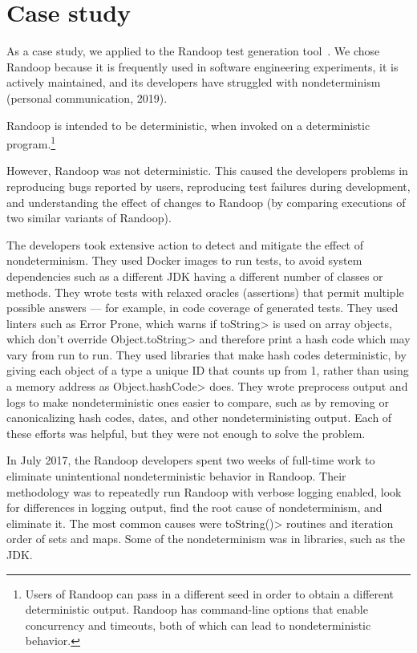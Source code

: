 \section{Case study}\label{sec:randoop-case-study}

As a case study, we applied \theDeterminismChecker to the Randoop test
generation tool~\ifanonymous{}\else\cite{PachecoLEB2007}\fi.
We chose Randoop because 
it is frequently used in software engineering experiments,
it is actively maintained,
and its developers have struggled with nondeterminism (personal
communication, 2019).

Randoop is intended to be deterministic, when invoked on a deterministic
program.\footnote{Users of Randoop can pass in a different seed in order to
  obtain a different deterministic output.  Randoop has command-line
  options that enable concurrency and timeouts, both of which can lead to
  nondeterministic behavior.}

However, Randoop was not deterministic.  This caused the developers
problems in 
reproducing bugs reported by users, 
reproducing test failures during development, and
understanding the effect of changes to Randoop (by comparing executions of two
similar variants of Randoop).

The developers took extensive action to detect and mitigate the effect of nondeterminism.
They used Docker images to run tests, to avoid system dependencies such as
a different JDK having a different number of classes or methods.
They wrote tests with relaxed oracles (assertions) that permit multiple
possible answers --- for example, in code coverage of generated tests.
They used linters such as Error Prone, which warns if \<toString> is used on
array objects, which don't override \<Object.toString> and therefore print a
hash code which may vary from run to run.
They used libraries that make hash codes deterministic, by giving each
object of a type a unique ID that counts up from 1, rather than using a
memory address as \<Object.hashCode> does.
They wrote preprocess output and logs to make nondeterministic ones easier
to compare, such as by removing or canonicalizing hash codes, dates, and
other nondeterministing output.
Each of these efforts was helpful, but they were not enough to solve the problem.

In July 2017, the Randoop developers spent two weeks of full-time work to
eliminate unintentional nondeterministic behavior in Randoop.
Their methodology was to repeatedly
 run Randoop with verbose logging enabled,
 look for differences in logging output,
 find the root cause of nondeterminism,
 and eliminate it.
The most common causes were \<toString()> routines and iteration order of sets and maps.
Some of the nondeterminism was in libraries, such as the JDK\@.

